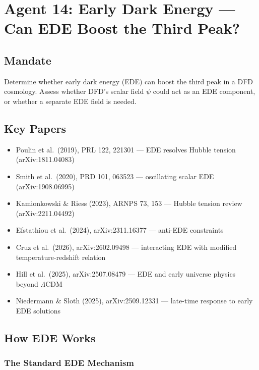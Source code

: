 \documentclass[11pt,a4paper]{article}
\begin{document}
\newpage
\section{Agent 14: Early Dark Energy --- Can EDE Boost the Third Peak?}
\label{sec:agent14}

\subsection{Mandate}

Determine whether early dark energy (EDE) can boost the third peak in a DFD cosmology. Assess whether DFD's scalar field $\psi$ could act as an EDE component, or whether a separate EDE field is needed.

\subsection{Key Papers}

\begin{itemize}
\item Poulin et al.\ (2019), PRL 122, 221301 --- EDE resolves Hubble tension (arXiv:1811.04083)
\item Smith et al.\ (2020), PRD 101, 063523 --- oscillating scalar EDE (arXiv:1908.06995)
\item Kamionkowski \& Riess (2023), ARNPS 73, 153 --- Hubble tension review (arXiv:2211.04492)
\item Efstathiou et al.\ (2024), arXiv:2311.16377 --- anti-EDE constraints
\item Cruz et al.\ (2026), arXiv:2602.09498 --- interacting EDE with modified temperature-redshift relation
\item Hill et al.\ (2025), arXiv:2507.08479 --- EDE and early universe physics beyond $\Lambda$CDM
\item Niedermann \& Sloth (2025), arXiv:2509.12331 --- late-time response to early EDE solutions
\end{itemize}

\subsection{How EDE Works}

\subsubsection{The Standard EDE Mechanism}
\end{document}
